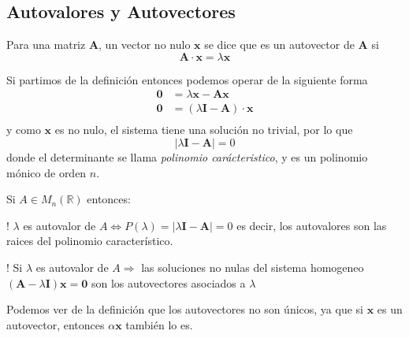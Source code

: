 \subsection{Autovalores y Autovectores}
\begin{definition}
    Para una matriz $ \bm{A} $, un vector no nulo $ \bm{x}$ se dice que 
    es un autovector de $ \bm{A}$ si
    \begin{equation*}
        \bm{A} \cdot \bm{x} = \lambda \bm{x} 
    \end{equation*}
\end{definition}
\begin{obs}
    Si partimos de la definición entonces podemos operar de la siguiente forma
    \begin{equation*}
        \begin{split}
            \bm{0} &= \lambda \bm{x} - \bm{A} \bm{x}\\
            \bm{0} &= (\lambda \bm{I} - \bm{A})\cdot \bm{x}\\
        \end{split}
    \end{equation*}
    y como $\bm{x}$ es no nulo, el sistema tiene una solución no trivial, por lo que
    \begin{equation}
        \label{eqn:autovalores}
        | \lambda \bm{I} - \bm{A} | = 0
    \end{equation}
    donde el determinante se llama \textit{polinomio carácteristico}, y es un polinomio
    mónico de orden $n$. 
\end{obs}

\begin{definition}
    Si $A \in M_n(\mathbb{R})$ entonces:
    \begin{bangenumerate}
        \item! $\lambda$ es autovalor de $A \Leftrightarrow P(\lambda)=  | \lambda \bm{I} - \bm{A} | = 0$
        es decir, los autovalores son las raices del polinomio característico.
        \item! Si $\lambda$ es autovalor de $A \Rightarrow$ las soluciones no nulas
        del sistema homogeneo $(\bm{A}-\lambda \bm{I})\bm{x}=\bm{0}$ son los
        autovectores asociados a $\lambda$
    \end{bangenumerate}
\end{definition}

\begin{obs}
    Podemos ver de la definición que los autovectores no son únicos, ya que
    si $\bm{x}$ es un autovector, entonces $\alpha\bm{x}$ también lo es.
\end{obs}

